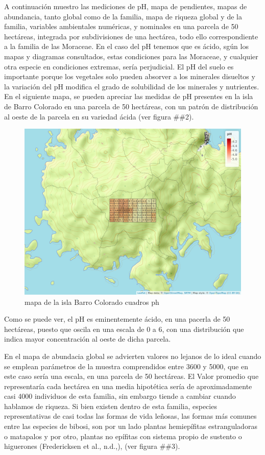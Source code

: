 \documentclass[11pt,]{article}
\begin{document}
A continuación muestro las mediciones de pH, mapa de pendientes, mapas
de abundancia, tanto global como de la familia, mapa de riqueza global y
de la familia, variables ambientales numéricas, y nominales en una
parcela de 50 hectáreas, integrada por subdivisiones de una hectárea,
todo ello correspondiente a la familia de las Moraceae. En el caso del
pH tenemos que es ácido, sgún los mapas y diagramas consultados, estas
condiciones para las Moraceae, y cualquier otra especie en condiciones
extremas, sería perjudicial. El pH del suelo es importante porque los
vegetales solo pueden absorver a los minerales disueltos y la variación
del pH modifica el grado de solubilidad de los minerales y nutrientes.
En el siguiente mapa, se pueden apreciar las medidas de pH presentes en
la isla de Barro Colorado en una parcela de 50 hectáreas, con un patrón
de distribución al oeste de la parcela en su variedad ácida (ver figura
\#\#2).

\begin{figure}
\centering
\includegraphics[width=1.00000\textwidth]{mapa_cuadros_ph.png}
\caption{mapa de la isla Barro Colorado cuadros ph\label{fig:bci_map}}
\end{figure}

Como se puede ver, el pH es eminentemente ácido, en una pacerla de 50
hectáreas, puesto que oscila en una escala de 0 a 6, con una
distribución que indica mayor concentración al oeste de dicha parcela.

En el mapa de abundacia global se advierten valores no lejanos de lo
ideal cuando se emplean parámetros de la muestra comprendidos entre 3600
y 5000, que en este caso sería una escala, en una parcela de 50
hectáreas. El Valor promedio que representaría cada hectárea en una
media hipotética sería de aproximadamente casi 4000 individuos de esta
familia, sin embargo tiende a cambiar cuando hablamos de riqueza. Si
bien existen dentro de esta familia, especies representativas de casi
todas las formas de vida leñosas, las formas más comunes entre las
especies de bibosi, son por un lado plantas hemiepífitas estranguladoras
o matapalos y por otro, plantas no epífitas con sistema propio de
sustento o higuerones (Fredericksen et al., n.d.,), (ver figura \#\#3).
\end{document}
